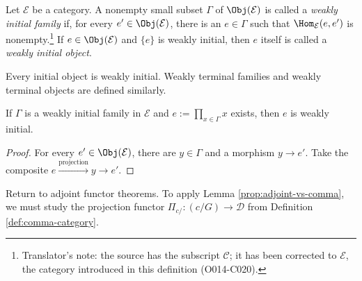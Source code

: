 \begin{definition}
	Let $\mathcal{E}$ be a category. A nonempty small subset $\Gamma$ of
	$\Obj(\mathcal{E})$ is called a \emph{weakly initial family} if, for every
	$e'\in\Obj(\mathcal{E})$, there is an $e\in\Gamma$ such that
	$\Hom_{\mathcal{E}}(e,e')$ is nonempty.\footnote{Translator's note: the
	source has the subscript $\mathcal{C}$; it has been corrected to
	$\mathcal{E}$, the category introduced in this definition (O014-C020).}
	If $e\in\Obj(\mathcal{E})$ and $\{e\}$ is weakly initial, then $e$ itself
	is called a \emph{weakly initial object}.
\end{definition}

Every initial object is weakly initial. Weakly terminal families and weakly
terminal objects are defined similarly.

\begin{lemma}\label{prop:weakly-initial-prod}
	If $\Gamma$ is a weakly initial family in $\mathcal{E}$ and
	$e:=\prod_{x\in\Gamma}x$ exists, then $e$ is weakly initial.
\end{lemma}
\begin{proof}
	For every $e'\in\Obj(\mathcal{E})$, there are $y\in\Gamma$ and a morphism
	$y\to e'$. Take the composite
	$e\xrightarrow{\text{projection}}y\to e'$.
\end{proof}

Return to adjoint functor theorems. To apply Lemma
\ref{prop:adjoint-vs-comma}, we must study the projection functor
$\Pi_{c/}:(c/G)\to\mathcal{D}$ from Definition \ref{def:comma-category}.

